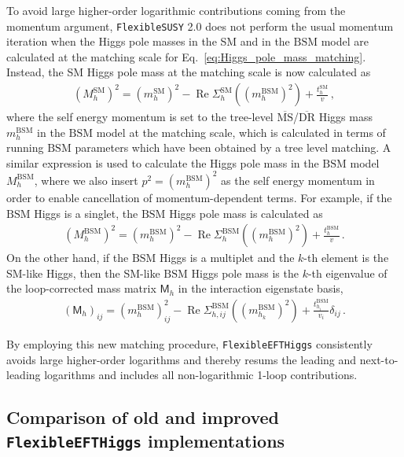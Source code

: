 \documentclass[final,3p,11pt,pdflatex]{elsarticle}
\makeatletter
\newcommand{\fs}{\texttt{FlexibleSUSY}\@\xspace}
\newcommand{\fstwo}{\fs 2.0\@\xspace}
\newcommand{\feft}{\texttt{Flex\-ib\-le\-EFT\-Higgs}\@\xspace}
\newcommand{\ol}[1]{\overline{#1}}
\newcommand{\MSbar}{\ensuremath{\ol{\text{MS}}}\xspace}
\newcommand{\DRbar}{\ensuremath{\ol{\text{DR}}}\xspace}
\newcommand{\SM}{\ensuremath{\text{SM}}\xspace}
\newcommand{\BSM}{\ensuremath{\text{BSM}}\xspace}
\DeclareMathOperator{\re}{Re}
\makeatother
\begin{document}
To avoid large higher-order logarithmic contributions coming from the
momentum argument, \fstwo does not  perform the usual momentum
iteration when the Higgs pole masses in the SM and in the
\BSM model are calculated at the matching scale for
Eq.~\eqref{eq:Higgs_pole_mass_matching}.  Instead, the SM Higgs pole mass at
the matching scale is now calculated as
%
\begin{align}
  (M_h^\SM)^2 = (m_h^\SM)^2 - \re\Sigma_h^{\SM}((m_h^\BSM)^2) + \frac{t_h^\SM}{v} \,,
  \label{eq:Higgs_pole_mass_matching_new}
\end{align}
%
where the self energy momentum is set to the tree-level
\MSbar/\DRbar Higgs mass $m_h^\BSM$ in the \BSM model at the matching
scale, which is calculated in terms of running \BSM parameters which
have been obtained by a tree level matching.
%
A similar expression is used to calculate the Higgs pole mass in the
\BSM model $M_h^\BSM$, where we also insert $p^2 = (m_h^\BSM)^2$ as the
self energy momentum in order to enable cancellation of
momentum-dependent terms.  For example, if the \BSM Higgs is a
singlet, the \BSM Higgs pole mass is calculated as
%
\begin{align}
  (M_h^\BSM)^2 = (m_h^\BSM)^2 - \re\Sigma_h^{\BSM}((m_h^\BSM)^2) + \frac{t_h^\BSM}{v} \,.
  \label{eq:Higgs_pole_mass_matching_new_BSM_singlet}
\end{align}
%
On the other hand, if the \BSM Higgs is a multiplet and the $k$-th
element is the SM-like Higgs, then the SM-like \BSM Higgs pole mass is
the $k$-th eigenvalue of the loop-corrected mass matrix $\mathsf{M}_h$
in the interaction eigenstate basis,
%
\begin{align}
  (\mathsf{M}_h)_{ij} =
  (m_h^\BSM)^2_{ij} - \re\Sigma_{h,ij}^{\BSM}((m_{h_k}^\BSM)^2) + \frac{t_{h_i}^\BSM}{v_i}\delta_{ij}  \,.
  \label{eq:Higgs_pole_mass_matching_new_BSM_multiplet}
\end{align}
%

By employing this new matching procedure, \feft consistently avoids
large higher-order logarithms and thereby
resums the leading and next-to-leading logarithms and includes all
non-logarithmic 1-loop contributions.

\subsection{Comparison of old and improved \feft implementations}
\end{document}
